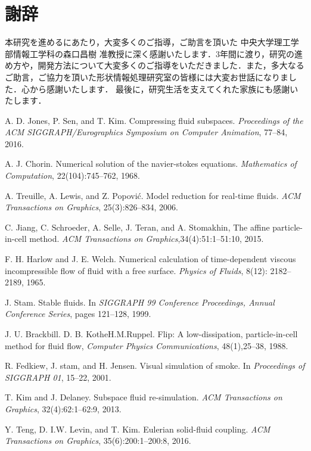 \documentclass[a4j,12pt]{jreport}
\def\syaji{ \chapter*{謝辞} \addcontentsline{toc}{chapter}{謝辞}}
\begin{document}
\syaji
\par
本研究を進めるにあたり，大変多くのご指導，ご助言を頂いた
中央大学理工学部情報工学科の森口昌樹 准教授に深く感謝いたします．3年間に渡り，研究の進め方や，開発方法について大変多くのご指導をいただきました．また，多大なるご助言，ご協力を頂いた形状情報処理研究室の皆様には大変お世話になりました．心から感謝いたします．
最後に，研究生活を支えてくれた家族にも感謝いたします．
\begin{thebibliography}{99}
A. D. Jones, P. Sen, and T. Kim. Compressing fluid subspaces. \textit{Proceedings of the ACM SIGGRAPH/Eurographics Symposium on Computer Animation}, 77--84, 2016.

A. J. Chorin. Numerical solution of the navier-stokes equations. \textit{Mathematics of Computation}, 22(104):745--762, 1968.

A. Treuille, A. Lewis, and Z. Popovi\'{c}. Model reduction for real-time fluids. \textit{ACM Transactions on Graphics}, 25(3):826--834, 2006.

C. Jiang, C. Schroeder, A. Selle, J. Teran, and A. Stomakhin, The affine particle-in-cell method. \textit{ACM Transactions on Graphics},34(4):51:1--51:10, 2015.

F. H. Harlow and J. E. Welch. Numerical calculation of time-dependent viscous incompressible flow of fluid with a free surface. \textit{Physics of Fluids}, 8(12): 2182--2189, 1965.

J. Stam. Stable fluids. In \textit{SIGGRAPH 99 Conference Proceedings, Annual Conference Series}, pages 121--128, 1999.

J. U. Brackbill. D. B. KotheH.M.Ruppel. Flip: A low-dissipation, particle-in-cell method for fluid flow, \textit{Computer Physics Communications}, 48(1),25--38, 1988.

R. Fedkiew, J. stam, and H. Jensen. Visual simulation of smoke. In \textit{Proceedings of SIGGRAPH 01}, 15--22, 2001.

T. Kim and J. Delaney. Subspace fluid re-simulation. \textit{ACM Transactions on Graphics}, 32(4):62:1--62:9, 2013.

Y. Teng, D. I.W. Levin, and T. Kim. Eulerian solid-fluid coupling. \textit{ACM Transactions on Graphics}, 35(6):200:1--200:8, 2016.

\end{thebibliography}
\end{document}
